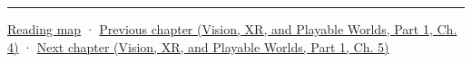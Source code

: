 \begin{center}\rule{0.5\linewidth}{0.5pt}\end{center}

\hyperref[volume-reading-map]{Reading map} · \href{../07-Vision-XR-and-Playable-Worlds-P01/main.pdf\#nameddest=04-visual-computing-ii-ch034-learned-3d-shapes-and-scene-representations}{Previous chapter (Vision, XR, and Playable Worlds, Part 1, Ch. 4)} · \href{../07-Vision-XR-and-Playable-Worlds-P01/main.pdf\#nameddest=04-visual-computing-ii-ch036-source-atlas-and-reconstruction-checkpoints}{Next chapter (Vision, XR, and Playable Worlds, Part 1, Ch. 5)}
